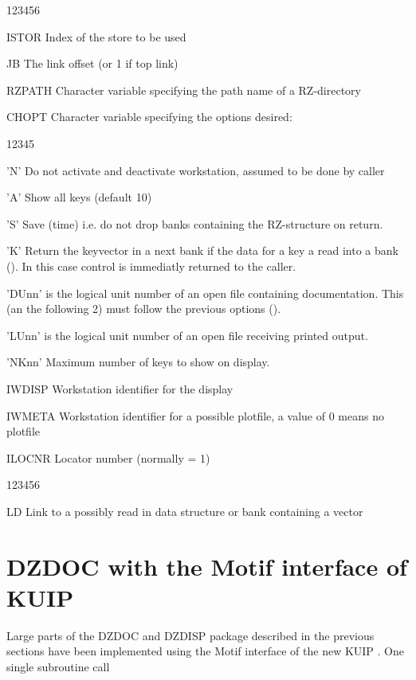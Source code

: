 \Idesc
 
\begin{DLtt}{123456}
\item[ISTOR]  Index of the store to be used
\item[JB]     The link offset (or 1 if top link)
\item[RZPATH] Character variable specifying the path name of a RZ-directory
\item[CHOPT]  Character variable specifying the options desired:
  \begin{DLtt}{12345}
    \item['N']    Do not activate and deactivate workstation,
                  assumed to be done by caller
    \item['A']    Show all keys (default 10)
    \item['S']    Save (time) i.e. do not drop banks containing
                  the RZ-structure on return.
    \item['K']    Return the keyvector in a next bank if the data for
                  a key a read into a bank (). 
                  In this case control is immediatly returned to the caller.
    \item['DUnn']  is the logical unit number of an open file
                  containing documentation. This (an the following 2)
                  must follow the previous options ().
    \item['LUnn']  is the logical unit number of an open file
                  receiving printed output.
    \item['NKnn'] Maximum number of keys to show on display.
  \end{DLtt}
\item[IWDISP] Workstation identifier for the display
\item[IWMETA] Workstation identifier for a possible plotfile,
              a value of 0 means no plotfile
\item[ILOCNR] Locator number (normally = 1)
\end{DLtt}
 
\Odesc
 
\begin{DLtt}{123456}
\item[LD]  Link to a possibly read in data structure or bank containing 
           a vector
\end{DLtt}
 
\section{DZDOC with the Motif interface of KUIP}
Large parts of the DZDOC and DZDISP package described in the previous
sections have been implemented using the Motif %
interface of the new KUIP \cite{bib-KUIP}. One single subroutine 
call
 
